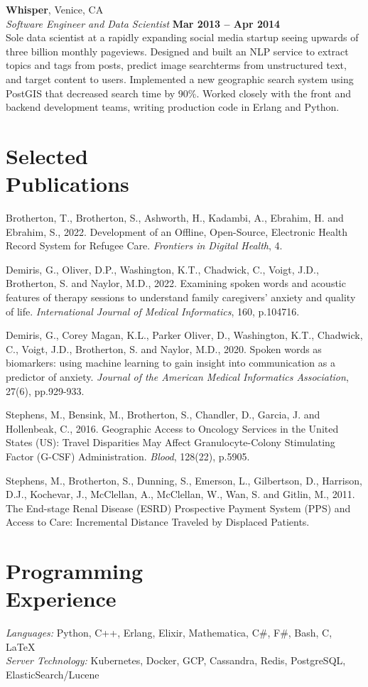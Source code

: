 \documentclass[margin,line]{resume}
\begin{document}
\begin{resume}
    \textbf{Whisper}, Venice, CA \vspace{2mm}\\\vspace{1mm}%
    \textsl{Software Engineer and Data Scientist} \hfill \textbf{Mar 2013 -- Apr 2014}\\
    Sole data scientist at a rapidly expanding social media startup
    seeing upwards of three billion monthly pageviews. Designed and built an NLP
    service to extract topics and tags from posts, predict image searchterms
    from unstructured text, and target content to users. Implemented a new
    geographic search system using PostGIS that decreased search time by
    90\%. Worked closely with the front and backend development teams, writing
    production code in Erlang and Python.

    \section{\mysidestyle Selected\\Publications}
    Brotherton, T., Brotherton, S., Ashworth, H., Kadambi, A., Ebrahim, H. and Ebrahim, S., 2022. Development of an Offline, Open-Source, Electronic Health Record System for Refugee Care. \emph{Frontiers in Digital Health}, 4.

    Demiris, G., Oliver, D.P., Washington, K.T., Chadwick, C., Voigt, J.D., Brotherton, S. and Naylor, M.D., 2022. Examining spoken words and acoustic features of therapy sessions to understand family caregivers’ anxiety and quality of life. \emph{International Journal of Medical Informatics}, 160, p.104716.

    Demiris, G., Corey Magan, K.L., Parker Oliver, D., Washington, K.T., Chadwick, C., Voigt, J.D., Brotherton, S. and Naylor, M.D., 2020. Spoken words as biomarkers: using machine learning to gain insight into communication as a predictor of anxiety. \emph{Journal of the American Medical Informatics Association}, 27(6), pp.929-933.

    Stephens, M., Bensink, M., Brotherton, S., Chandler, D., Garcia, J. and Hollenbeak, C., 2016. Geographic Access to Oncology Services in the United States (US): Travel Disparities May Affect Granulocyte-Colony Stimulating Factor (G-CSF) Administration. \emph{Blood}, 128(22), p.5905.

    Stephens, M., Brotherton, S., Dunning, S., Emerson, L., Gilbertson, D., Harrison, D.J., Kochevar, J., McClellan, A., McClellan, W., Wan, S. and Gitlin, M., 2011. The End-stage Renal Disease (ESRD) Prospective Payment System (PPS) and Access to Care: Incremental Distance Traveled by Displaced Patients.

\section{\mysidestyle Programming\\Experience}

\emph{Languages:} Python, C++, Erlang, Elixir, Mathematica,  C\#, F\#, Bash, C, \LaTeX \\
\emph{Server Technology:} Kubernetes, Docker, GCP, Cassandra, Redis, PostgreSQL, ElasticSearch/Lucene

\end{resume}
\end{document}
